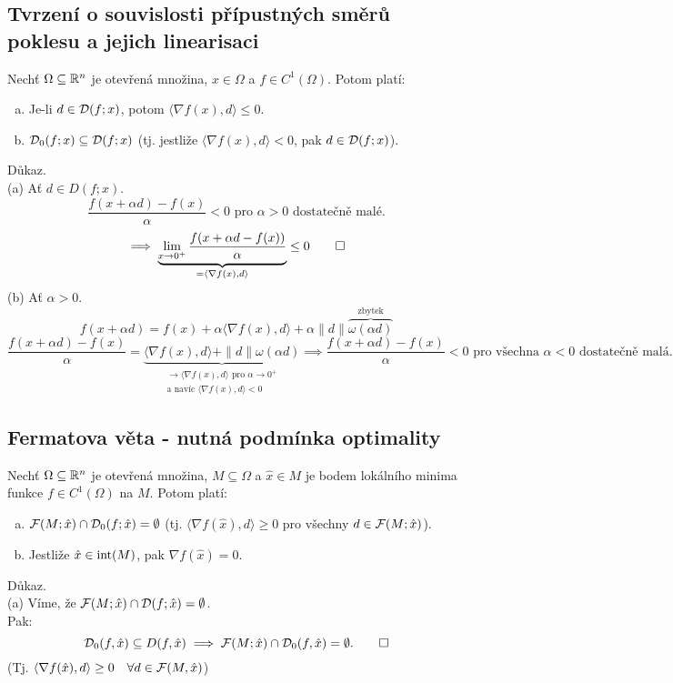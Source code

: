 \subsection{Tvrzení o souvislosti přípustných směrů poklesu a jejich linearisaci}
Nechť $\Omega \subseteq \mathbb{R}^n$ je otevřená množina, $x \in \Omega$ a $f \in C^1(\Omega)$. Potom platí:
\begin{enumerate}[(a)]
    \item Je-li $d \in \mathcal{D}(f; x)$, potom $\langle \nabla f(x), d\rangle \leq 0$.
    \item $\mathcal{D}_0(f;x) \subseteq \mathcal{D}(f;x)$ (tj. jestliže $\langle \nabla f(x), d\rangle < 0$, pak $d \in \mathcal{D}(f;x)$).
\end{enumerate}
Důkaz.\\
(a) Ať $d \in D(f;x)$.
\[
    \frac{f(x + \alpha d) - f(x)}{\alpha} < 0 \text{ pro } \alpha > 0 \text{ dostatečně malé.}
\]
\[
    \implies \underbrace{\lim_{x\rightarrow 0^+ } \frac{f(x+\alpha d - f(x))}{\alpha}}_{= \langle \nabla f(x), d\rangle}
    \leq 0 \qed
\]
\newpage
(b) Ať $\alpha > 0$.
\[
    f(x+\alpha d) = f(x) + \alpha \langle \nabla f(x), d\rangle + \alpha \| d\|
    \overbrace{\omega (\alpha d)}^{\text{zbytek}}
\]
\[
    \frac{f(x+\alpha d) - f(x)}{\alpha} = \underbrace{\langle \nabla f(x), d\rangle + \| d\| \omega (\alpha d)}_{
    \substack{\rightarrow \langle \nabla f(x), d\rangle \text{ pro } \alpha \rightarrow 0^+ \\ \text{a navíc }
    \langle\nabla f(x), d \rangle < 0}} \implies \frac{f(x + \alpha d) - f(x)}{\alpha} < 0
    \text{ pro všechna } \alpha < 0 \text{ dostatečně malá.}
\]

\subsection{Fermatova věta - nutná podmínka optimality}\label{fermat}
Nechť $\Omega \subseteq \mathbb{R}^n$ je otevřená množina, $M \subseteq \Omega$ a $\hat x \in M$ je bodem lokálního minima
funkce $f \in C^1(\Omega)$ na $M$. Potom platí:
\begin{enumerate}[(a)]
    \item $\mathcal{F}(M; \hat x) \cap \mathcal{D}_0(f; \hat x) = \emptyset$ (tj. $\langle \nabla f(\hat x), d\rangle \geq 0$ pro všechny
    $d \in \mathcal{F}(M; \hat x)$).
    \item Jestliže $\hat x \in \operatorname{int}(M)$, pak $\nabla f(\hat x) = 0$.
\end{enumerate}
Důkaz.\\
(a) Víme, že $\mathcal{F}(M; \hat x) \cap \mathcal{D}(f; \hat x) = \emptyset$.\\ \label{fermatA}
Pak:
\[
    \mathcal{D}_0 (f, \hat x) \subseteq D(f, \hat x) \implies \mathcal{F}(M; \hat x) \cap \mathcal{D}_0(f, \hat x) = \emptyset. \qed
\]
(Tj. $\langle \nabla f(\hat x), d\rangle \geq 0 \quad \forall d \in \mathcal{F}(M, \hat x)$)

